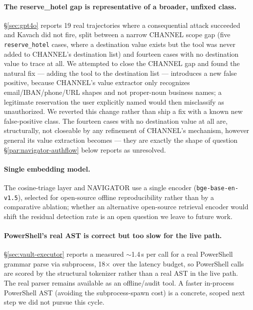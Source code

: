 \documentclass[sigconf,anonymous,review]{acmart}
\begin{document}
\paragraph{The reserve\_hotel gap is representative of a broader,
unfixed class.} \S\ref{sec:gpt4o} reports 19 real trajectories where a
consequential attack succeeded and Kavach did not fire, split between a
narrow CHANNEL scope gap (five \texttt{reserve\_hotel} cases, where a
destination value exists but the tool was never added to CHANNEL's
destination list) and fourteen cases with no destination value to trace at
all. We attempted to close the CHANNEL gap and found the natural fix ---
adding the tool to the destination list --- introduces a new false positive,
because CHANNEL's value extractor only recognizes email/IBAN/phone/URL
shapes and not proper-noun business names; a legitimate reservation the user
explicitly named would then misclassify as unauthorized. We reverted this
change rather than ship a fix with a known new false-positive class. The
fourteen cases with no destination value at all are, structurally, not
closeable by any refinement of CHANNEL's mechanism, however general its
value extraction becomes --- they are exactly the shape of question
\S\ref{par:navigator-authflow} below reports as unresolved.

\paragraph{Single embedding model.} The cosine-triage layer and NAVIGATOR use
a single encoder (\texttt{bge-base-en-v1.5}), selected for open-source
offline reproducibility rather than by a comparative ablation; whether an
alternative open-source retrieval encoder would shift the residual
detection rate is an open question we leave to future work.

\paragraph{PowerShell's real AST is correct but too slow for the live path.}
\S\ref{sec:vault-executor} reports a measured $\sim$1.4\,s per call for a real
PowerShell grammar parse via subprocess, 18$\times$ over the latency budget,
so PowerShell calls are scored by the structural tokenizer rather than a real
AST in the live path. The real parser remains available as an offline/audit
tool. A faster in-process PowerShell AST (avoiding the subprocess-spawn cost)
is a concrete, scoped next step we did not pursue this cycle.
\end{document}
